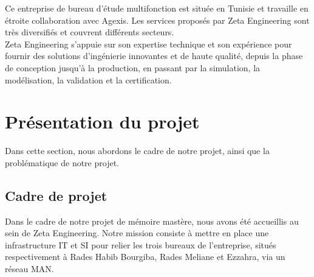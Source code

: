 Ce entreprise de bureau d'étude multifonction est située en Tunisie et travaille en étroite collaboration avec Agexis. Les services proposés par Zeta Engineering sont très diversifiés et couvrent différents secteurs. \\

Zeta Engineering s'appuie sur son expertise technique et son expérience pour fournir des solutions d'ingénierie innovantes et de haute qualité, depuis la phase de conception jusqu'à la production, en passant par la simulation, la modélisation, la validation et la certification.  \\





\section{Présentation du projet}

Dans cette section, nous abordons le cadre de notre projet, ainsi que la problématique de notre projet.


\subsection{Cadre de projet}
Dans le cadre de notre projet de mémoire mastère, nous avons été accueillis au sein de Zeta Engineering. Notre mission consiste à mettre en place une infrastructure IT et SI pour relier les trois bureaux de l'entreprise, situés respectivement à Rades Habib Bourgiba, Rades Meliane et Ezzahra, via un réseau MAN.\\


